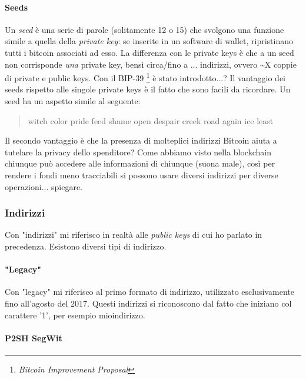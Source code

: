 \documentclass {article}
\begin{document}
\paragraph {Seeds}


Un \textit{seed} è una serie di parole (solitamente 12 o 15) che svolgono una funzione simile a quella della \textit{private key}: se inserite in un software di wallet, ripristinano tutti i bitcoin associati ad esso.
La differenza con le private keys è che a un seed non corrisponde \emph{una} private key, bensì circa/fino a ... indirizzi, ovvero \textasciitilde X coppie di private e public keys.
Con il BIP-39 \footnote{\textit{Bitcoin Improvement Proposal}} è stato introdotto...?
Il vantaggio dei seeds rispetto alle singole private keys è il fatto che sono facili da ricordare. Un seed ha un aspetto simile al seguente:

\begin {quote}

witch color pride feed shame open despair creek road again ice least

\end {quote}
%
Il secondo vantaggio è che la presenza di molteplici indirizzi Bitcoin aiuta a tutelare la privacy dello spenditore?
Come abbiamo visto nella blockchain chiunque può accedere alle informazioni di chiunque (suona male), così per rendere i fondi meno tracciabili si possono usare diversi indirizzi per diverse operazioni... spiegare.


\subsubsection {Indirizzi} %


Con "indirizzi" mi riferisco in realtà alle \textit{public keys} di cui ho parlato in precedenza.
Esistono diversi tipi di indirizzo.


\paragraph {"Legacy"}


Con "legacy" mi riferisco al primo formato di indirizzo, utilizzato esclusivamente fino all'agosto del 2017.
Questi indirizzi si riconoscono dal fatto che iniziano col carattere '1', per esempio mioindirizzo.


\paragraph {P2SH SegWit}
\end{document}
